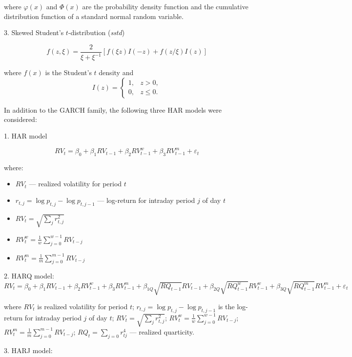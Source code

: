 \documentclass[]{article}
\begin{document}
where \(\varphi(x)\) and \(\Phi(x)\) are the probability density function and the cumulative distribution function of a standard normal random variable.

3. Skewed Student's \(t\)-distribution (\textit{sstd})

$$f(z, \xi) = \frac{2}{\xi + \xi^{-1}} \left[ f(\xi z) I(-z) + f(z/\xi) I(z) \right]$$

where \(f(x)\) is the Student's $t$ density and
$$I(z) =
\begin{cases}
	1, & z > 0, \\
	0, & z \leq 0.
\end{cases}
$$

In addition to the GARCH family, the following three HAR models were considered:

1. HAR model

$$RV_t = \beta_0 + \beta_1 RV_{t-1} + \beta_2 RV_{t-1}^w + \beta_3 RV_{t-1}^m + \varepsilon_t$$

where:
\begin{itemize}

	\item $RV_t$ --- realized volatility for period $t$

	\item $r_{t, j} = \log{p_{t, j}} - \log{p_{t, j-1}}$ --- log-return for intraday period $j$ of day $t$

	\item $RV_{t} = \sqrt{\sum_{j}r_{t, j}^2}$

	\item $RV_{t}^w = \frac{1}{w}\sum_{j=0}^{w-1}RV_{t-j}$

	\item $RV_{t}^m = \frac{1}{m}\sum_{j=0}^{m-1}RV_{t-j}$

\end{itemize}

2. HARQ model:
$$RV_t = \beta_0 + \beta_1 RV_{t-1} + \beta_2 RV_{t-1}^w + \beta_3 RV_{t-1}^m + \beta_{1Q}\sqrt{RQ_{t-1}}RV_{t-1} + \beta_{2Q}\sqrt{RQ_{t-1}^w} RV_{t-1}^w  + \beta_{3Q}\sqrt{RQ_{t-1}^m}RV_{t-1}^m + \varepsilon_{t}$$

where $RV_t$ is realized volatility for period $t$; $r_{t, j} = \log{p_{t, j}} - \log{p_{t, j-1}}$ is the log-return for intraday period $j$ of day $t$; $RV_{t} = \sqrt{\sum_{j}r_{t, j}^2}$; $RV_{t}^w = \frac{1}{w}\sum_{j=0}^{w-1}RV_{t-j}$; $RV_{t}^m = \frac{1}{m}\sum_{j=0}^{m-1}RV_{t-j}$; $RQ_{t} = \sum_{j=0}r_{tj}^4$ --- realized quarticity.

3. HARJ model:
\end{document}
